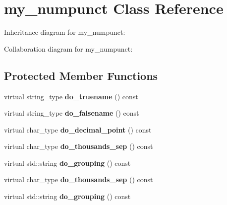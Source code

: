 \hypertarget{classmy__numpunct}{}\section{my\+\_\+numpunct Class Reference}
\label{classmy__numpunct}


Inheritance diagram for my\+\_\+numpunct\+:


Collaboration diagram for my\+\_\+numpunct\+:
\subsection*{Protected Member Functions}
\begin{DoxyCompactItemize}
\item 
\mbox{\label{classmy__numpunct_a3b97619c256a6a3cd60747b9c1bbd084}} 
virtual string\+\_\+type {\bfseries do\+\_\+truename} () const
\item 
\mbox{\label{classmy__numpunct_a2e7d085002ce87771b43e69f2ed37500}} 
virtual string\+\_\+type {\bfseries do\+\_\+falsename} () const
\item 
\mbox{\label{classmy__numpunct_a9de76f2f6beafce029f52414ecce7c5d}} 
virtual char\+\_\+type {\bfseries do\+\_\+decimal\+\_\+point} () const
\item 
\mbox{\label{classmy__numpunct_ae8e4a2f264795c77596cf270d7447d92}} 
virtual char\+\_\+type {\bfseries do\+\_\+thousands\+\_\+sep} () const
\item 
\mbox{\label{classmy__numpunct_ae6a03737ec958404f7f11693d772d1ee}} 
virtual std\+::string {\bfseries do\+\_\+grouping} () const
\item 
\mbox{\label{classmy__numpunct_ae8e4a2f264795c77596cf270d7447d92}} 
virtual char\+\_\+type {\bfseries do\+\_\+thousands\+\_\+sep} () const
\item 
\mbox{\label{classmy__numpunct_ae6a03737ec958404f7f11693d772d1ee}} 
virtual std\+::string {\bfseries do\+\_\+grouping} () const
\item 
\mbox{\label{classmy__numpunct_a9de76f2f6beafce029f52414ecce7c5d}} 

\end{DoxyCompactItemize}

